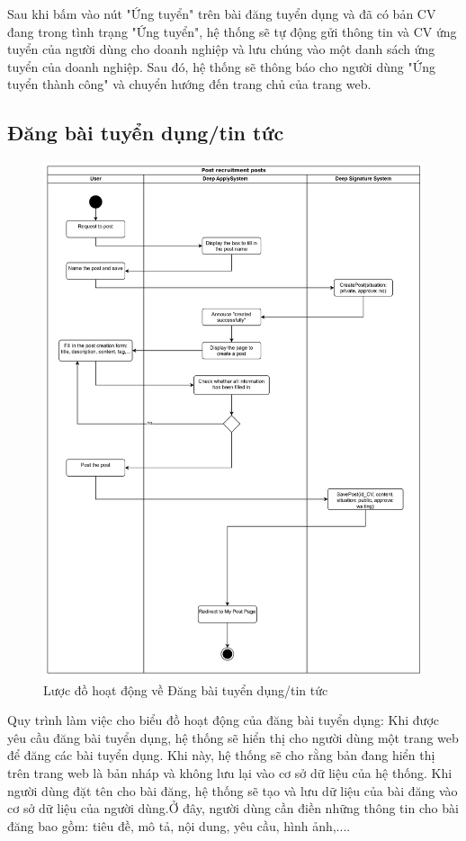 Sau khi bấm vào nút "Ứng tuyển" trên bài đăng tuyển dụng và đã có bản CV đang trong tình trạng "Ứng tuyển", hệ thống sẽ tự động gửi thông tin và CV ứng tuyển của người dùng cho doanh nghiệp và lưu chúng vào một danh sách ứng tuyển của doanh nghiệp. Sau đó, hệ thống sẽ thông báo cho người dùng "Ứng tuyển thành công" và chuyển hướng đến trang chủ của trang web.

\subsection{Đăng bài tuyển dụng/tin tức}


\begin{figure}[H]

	\centering
    \includegraphics[scale=0.07]{img/Post_workflow.png}
    \caption{Lược đồ hoạt động về Đăng bài tuyển dụng/tin tức}
\end{figure}

Quy trình làm việc cho biểu đồ hoạt động của đăng bài tuyển dụng: Khi được yêu cầu đăng bài tuyển dụng, hệ thống sẽ hiển thị cho người dùng một trang web để đăng các bài tuyển dụng. Khi này, hệ thống sẽ cho rằng bản đang hiển thị trên trang web là bản nháp và không lưu lại vào cơ sở dữ liệu của hệ thống. Khi người dùng đặt tên cho bài đăng, hệ thống sẽ tạo và lưu dữ liệu của bài đăng vào cơ sở dữ liệu của người dùng.Ở đây, người dùng cần điền những thông tin cho bài đăng bao gồm: tiêu đề, mô tả, nội dung, yêu cầu, hình ảnh,.... 

